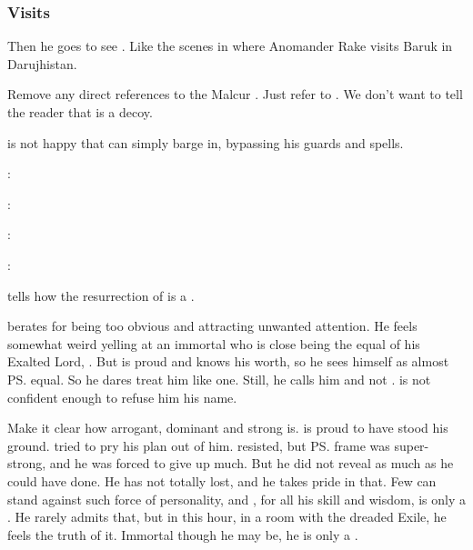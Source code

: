 \begin{garbage}
\subsubsection{Visits \Psyrex}
Then he goes to see \Psyrex. 
Like the scenes in \cite{StevenErikson:GardensoftheMoon} where Anomander Rake visits Baruk in Darujhistan. 

Remove any direct references to the Malcur \nexus. 
Just refer to . 
We don't want to tell the reader that \Forklin{} is a decoy. 

\Psyrex{} is not happy that \Ishnaruchaefir{} can simply barge in, bypassing his guards and spells. 

\begin{prose}
  \Ishnaruchaefir: 
  
  \Psyrex: 
  
  \Ishnaruchaefir: 
  
  \Psyrex: 
\end{prose}


\Psyrex{} tells how the resurrection of \Nithdornazsh{} is a .  

\Psyrex{} berates \Ishnaruchaefir{} for being too obvious and attracting unwanted attention. 
He feels somewhat weird yelling at an immortal who is close being the equal of his Exalted Lord, \Secherdamon. 
But \Psyrex{} is proud and knows his worth, so he sees himself as almost \ps{\Ishnaruchaefir} equal. 
So he dares treat him like one. 
Still, he calls him \quo{\Ishnaruchaefir} and not . 
\Psyrex{} is not confident enough to refuse him his name. 

Make it clear how arrogant, dominant and strong \QuessanthIshnaruchaefir{} is. 
\Psyrex{} is proud to have stood his ground. 
\Ishnaruchaefir{} tried to pry his plan out of him.
\Psyrex{} resisted, but \ps{\Ishnaruchaefir} frame was super-strong, and he was forced to give up much.
But he did not reveal as much as he could have done. 
He has not totally lost, and he takes pride in that. 
Few can stand against such force of personality, and \Psyrex, for all his skill and wisdom, is only a \scatha. 
He rarely admits that, but in this hour, in a room with the dreaded Exile, he feels the truth of it.
Immortal though he may be, he is only a \scatha. 


\end{garbage}
